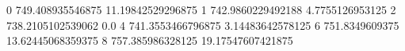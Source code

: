 0 749.408935546875 11.19842529296875
1 742.9860229492188 4.7755126953125
2 738.2105102539062 0.0
4 741.3553466796875 3.14483642578125
6 751.8349609375 13.62445068359375
8 757.385986328125 19.17547607421875
